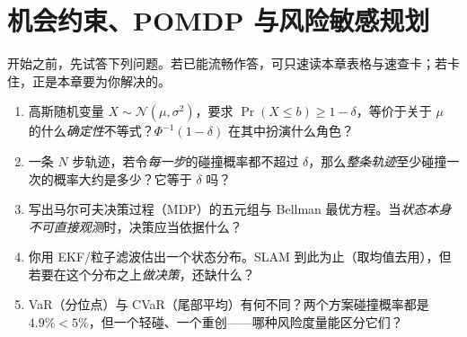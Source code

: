 \chapter{机会约束、POMDP 与风险敏感规划}
\label{ch:plan-chance}


\begin{practice}[前置自测]
开始之前，先试答下列问题。若已能流畅作答，可只速读本章表格与速查卡；若卡住，正是本章要为你解决的。
\begin{enumerate}
  \item 高斯随机变量 $X\sim\mathcal{N}(\mu,\sigma^2)$，要求 $\Pr(X\le b)\ge 1-\delta$，等价于关于 $\mu$ 的什么\emph{确定性}不等式？$\Phi^{-1}(1-\delta)$ 在其中扮演什么角色？
  \item 一条 $N$ 步轨迹，若令\emph{每一步}的碰撞概率都不超过 $\delta$，那么\emph{整条轨迹}至少碰撞一次的概率大约是多少？它等于 $\delta$ 吗？
  \item 写出马尔可夫决策过程（MDP）的五元组与 Bellman 最优方程。当\emph{状态本身不可直接观测}时，决策应当依据什么？
  \item 你用 EKF/粒子滤波估出一个状态分布。SLAM 到此为止（取均值去用），但若要在这个分布之上\emph{做决策}，还缺什么？
  \item VaR（分位点）与 CVaR（尾部平均）有何不同？两个方案碰撞概率都是 $4.9\%<5\%$，但一个轻碰、一个重创——哪种风险度量能区分它们？
\end{enumerate}
\end{practice}

